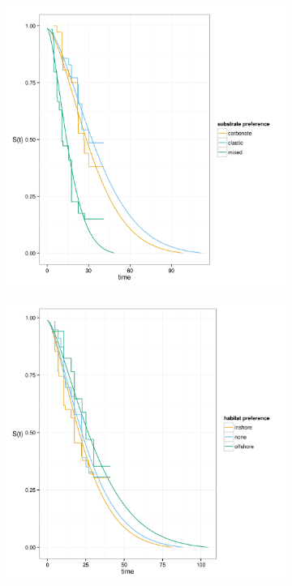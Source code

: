 \documentclass[12pt,letterpaper]{article}
\begin{document}
\begin{figure}[ht]
    \begin{subfigure}[b]{0.5\textwidth}
      \caption{}
      \includegraphics[height = 0.4\textheight, keepaspectratio = true]{figure/aff}
      \label{subfig:aff_surv}
    \end{subfigure}
    \begin{subfigure}[b]{0.5\textwidth}
      \caption{}
      \includegraphics[height = 0.4\textheight, keepaspectratio = true]{figure/hab}

\end{subfigure}
\end{figure}
\end{document}
